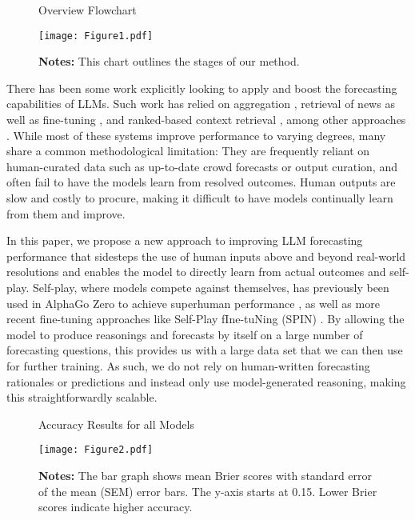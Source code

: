 \documentclass{article}
\begin{document}
\begin{figure}[htbp]
  \centering
  \captionsetup{position=above} %
  \caption{Overview Flowchart}
  \texttt{[image: Figure1.pdf]}
  \captionsetup{position=below} %
  \caption*{\textbf{Notes:} This chart outlines the stages of our method.}
  \label{fig:flowchart}
\end{figure}

There has been some work explicitly looking to apply and boost the forecasting capabilities of LLMs. Such work has relied on aggregation \cite{Schoenegger2024}, retrieval of news as well as fine-tuning \cite{Halawi2024}, and ranked-based context retrieval \cite{Yan2023}, among other approaches \cite{Lyu2024}. While most of these systems improve performance to varying degrees, many share a common methodological limitation: They are frequently reliant on human-curated data such as up-to-date crowd forecasts or output curation, and often fail to have the models learn from resolved outcomes. Human outputs are slow and costly to procure, making it difficult to have models continually learn from them and improve.

In this paper, we propose a new approach to improving LLM forecasting performance that sidesteps the use of human inputs above and beyond real-world resolutions and enables the model to directly learn from actual outcomes and self-play. Self-play, where models compete against themselves, has previously been used in AlphaGo Zero to achieve superhuman performance \citep{Silver2017}, as well as more recent fine-tuning approaches like Self-Play fIne-tuNing (SPIN) \citep{Chen2024}. By allowing the model to produce reasonings and forecasts by itself on a large number of forecasting questions, this provides us with a large data set that we can then use for further training. As such, we do not rely on human-written forecasting rationales or predictions and instead only use model-generated reasoning, making this straightforwardly scalable.


\begin{figure}[htbp]
  \centering
  \captionsetup{position=above} %
  \caption{Accuracy Results for all Models}
  \texttt{[image: Figure2.pdf]}
  \captionsetup{position=below} %
  \caption*{\textbf{Notes:} The bar graph shows mean Brier scores with standard error of the mean (SEM) error bars. The y-axis starts at 0.15. Lower Brier scores indicate higher accuracy.}
  \label{fig:accuracy}
\end{figure}
\end{document}

